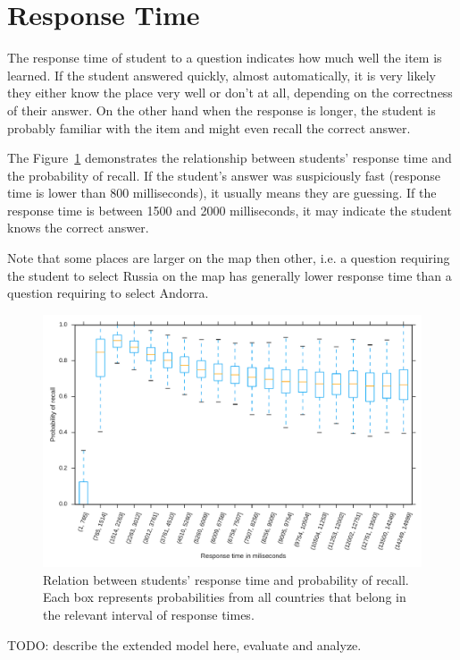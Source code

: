 \section{Response Time}

The response time of student to a question indicates how much well the item is learned. If the student answered quickly, almost automatically, it is very likely they either know the place very well or don't at all, depending on the correctness of their answer. On the other hand when the response is longer, the student is probably familiar with the item and might even recall the correct answer.

The Figure~\ref{fig-response-time} demonstrates the relationship between students' response time and the probability of recall. If the student's answer was suspiciously fast (response time is lower than 800 milliseconds), it usually means they are guessing. If the response time is between 1500 and 2000 milliseconds, it may indicate the student knows the correct answer.

Note that some places are larger on the map then other, i.e. a question requiring the student to select Russia on the map has generally lower response time than a question requiring to select Andorra.

\begin{figure}[htbp]
  \centering
  \includegraphics[width=\textwidth]{img/response-time}
  \caption{Relation between students' response time and probability of recall. Each box represents probabilities from all countries that belong in the relevant interval of response times.}
  \label{fig-response-time}
\end{figure}

TODO: describe the extended model here, evaluate and analyze.

